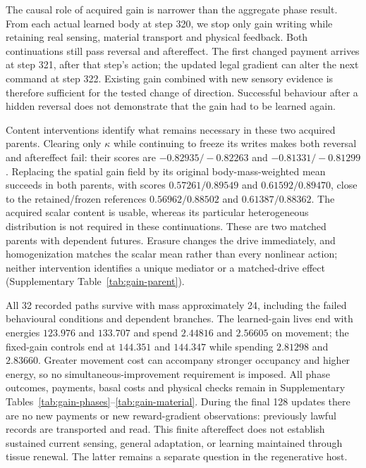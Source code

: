 The causal role of acquired gain is narrower than the aggregate phase result. From each actual learned body at step 320, we stop only gain writing while retaining real sensing, material transport and physical feedback. Both continuations still pass reversal and aftereffect. The first changed payment arrives at step 321, after that step's action; the updated legal gradient can alter the next command at step 322. Existing gain combined with new sensory evidence is therefore sufficient for the tested change of direction. Successful behaviour after a hidden reversal does not demonstrate that the gain had to be learned again.

Content interventions identify what remains necessary in these two acquired parents. Clearing only $\kappa$ while continuing to freeze its writes makes both reversal and aftereffect fail: their scores are $-0.82935/-0.82263$ and $-0.81331/-0.81299$. Replacing the spatial gain field by its original body-mass-weighted mean succeeds in both parents, with scores $0.57261/0.89549$ and $0.61592/0.89470$, close to the retained/frozen references $0.56962/0.88502$ and $0.61387/0.88362$. The acquired scalar content is usable, whereas its particular heterogeneous distribution is not required in these continuations. These are two matched parents with dependent futures. Erasure changes the drive immediately, and homogenization matches the scalar mean rather than every nonlinear action; neither intervention identifies a unique mediator or a matched-drive effect (Supplementary Table~\ref{tab:gain-parent}).

All 32 recorded paths survive with mass approximately 24, including the failed behavioural conditions and dependent branches. The learned-gain lives end with energies $123.976$ and $133.707$ and spend $2.44816$ and $2.56605$ on movement; the fixed-gain controls end at $144.351$ and $144.347$ while spending $2.81298$ and $2.83660$. Greater movement cost can accompany stronger occupancy and higher energy, so no simultaneous-improvement requirement is imposed. All phase outcomes, payments, basal costs and physical checks remain in Supplementary Tables~\ref{tab:gain-phases}--\ref{tab:gain-material}. During the final 128 updates there are no new payments or new reward-gradient observations: previously lawful records are transported and read. This finite aftereffect does not establish sustained current sensing, general adaptation, or learning maintained through tissue renewal. The latter remains a separate question in the regenerative host.


